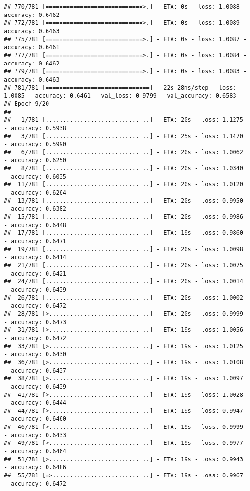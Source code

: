 \documentclass[
]{article}
\begin{document}
\begin{verbatim}
## 770/781 [============================>.] - ETA: 0s - loss: 1.0088 - accuracy: 0.6462
## 772/781 [============================>.] - ETA: 0s - loss: 1.0089 - accuracy: 0.6463
## 775/781 [============================>.] - ETA: 0s - loss: 1.0087 - accuracy: 0.6461
## 777/781 [============================>.] - ETA: 0s - loss: 1.0084 - accuracy: 0.6462
## 779/781 [============================>.] - ETA: 0s - loss: 1.0083 - accuracy: 0.6463
## 781/781 [==============================] - 22s 28ms/step - loss: 1.0085 - accuracy: 0.6461 - val_loss: 0.9799 - val_accuracy: 0.6583
## Epoch 9/20
## 
##   1/781 [..............................] - ETA: 20s - loss: 1.1275 - accuracy: 0.5938
##   3/781 [..............................] - ETA: 25s - loss: 1.1470 - accuracy: 0.5990
##   6/781 [..............................] - ETA: 20s - loss: 1.0062 - accuracy: 0.6250
##   8/781 [..............................] - ETA: 20s - loss: 1.0340 - accuracy: 0.6035
##  11/781 [..............................] - ETA: 20s - loss: 1.0120 - accuracy: 0.6264
##  13/781 [..............................] - ETA: 20s - loss: 0.9950 - accuracy: 0.6382
##  15/781 [..............................] - ETA: 20s - loss: 0.9986 - accuracy: 0.6448
##  17/781 [..............................] - ETA: 19s - loss: 0.9860 - accuracy: 0.6471
##  19/781 [..............................] - ETA: 20s - loss: 1.0098 - accuracy: 0.6414
##  21/781 [..............................] - ETA: 20s - loss: 1.0075 - accuracy: 0.6421
##  24/781 [..............................] - ETA: 20s - loss: 1.0014 - accuracy: 0.6439
##  26/781 [..............................] - ETA: 20s - loss: 1.0002 - accuracy: 0.6472
##  28/781 [>.............................] - ETA: 20s - loss: 0.9999 - accuracy: 0.6473
##  31/781 [>.............................] - ETA: 19s - loss: 1.0056 - accuracy: 0.6472
##  33/781 [>.............................] - ETA: 19s - loss: 1.0125 - accuracy: 0.6430
##  36/781 [>.............................] - ETA: 19s - loss: 1.0108 - accuracy: 0.6437
##  38/781 [>.............................] - ETA: 19s - loss: 1.0097 - accuracy: 0.6439
##  41/781 [>.............................] - ETA: 19s - loss: 1.0028 - accuracy: 0.6444
##  44/781 [>.............................] - ETA: 19s - loss: 0.9947 - accuracy: 0.6460
##  46/781 [>.............................] - ETA: 19s - loss: 0.9999 - accuracy: 0.6433
##  49/781 [>.............................] - ETA: 19s - loss: 0.9977 - accuracy: 0.6464
##  51/781 [>.............................] - ETA: 19s - loss: 0.9943 - accuracy: 0.6486
##  55/781 [=>............................] - ETA: 19s - loss: 0.9967 - accuracy: 0.6472

\end{verbatim}
\end{document}

